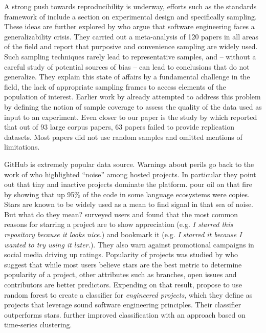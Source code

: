 \documentclass[sigconf,review,anonymous]{acmart}
\newcommand{\gh}{{GitHub}\xspace}
\begin{document}

 A strong push towards reproducibility is underway,
efforts such as the standards framework of \citet{Ralph:2021} include a section
on experimental design and specifically sampling. These ideas are further
explored by \citet{baltes20} who argue that software engineering faces a
generalizability crisis. They carried out a meta-analysis of 120 papers in all
areas of the field and report that purposive and convenience sampling are widely
used. Such sampling techniques rarely lead to representative samples, and --
without a careful study of potential sources of bias -- can lead to conclusions
that do not generalize. They explain this state of affairs by a fundamental
challenge in the field, the lack of appropriate sampling frames to access
elements of the population of interest. Earlier work by \citet{Nagappan:2013}
already attempted to address this problem by defining the notion of sample
coverage to assess the quality of the data used as input to an experiment. Even
closer to our paper is the study by \citet{Cosentino:MSR16} which reported that
out of 93 large corpus papers, 63 papers failed to provide replication datasets.
Most papers did not use random samples and omitted mentions of limitations.


 \gh is extremely popular data source. Warnings
about perils go back to the work of \citet{Kalliamvakou:2014} who highlighted
``noise'' among hosted projects. In particular they point out that tiny and
inactive projects dominate the platform. \citet{oopsla17a} pour oil on that fire
by showing that up 95\% of the code in some language ecosystems were copies.
Stars are known to be widely used as a mean to find signal in that sea of noise.
But what do they mean? \citet{Borges:2018:JSS} surveyed users and found that the
most common reasons for starring a project are to show appreciation (e.g. {\it I
  starred this repository because it looks nice.}) and bookmark it (e.g. {\it I
  starred it because I wanted to try using it later.}). They also warn against
promotional campaigns in social media driving up ratings. Popularity of projects
was studied by \citet{Han:2019:COMPSAC} who suggest that while most users
believe stars are the best metric to determine popularity of a project, other
attributes such as branches, open issues and contributors are better predictors.
Expending on that result, \citet{mun17} propose to use random forest to create
a classifier for \emph{engineered projects}, which they define as projects that
leverage sound software engineering principles. Their classifier outperforms
stars. \citet{pick19} further improved classification with an approach based on
time-series clustering.
\end{document}
